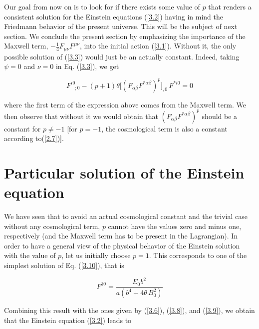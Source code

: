 \documentclass[a4paper,twocolumn,prd,superscriptaddress,nofootinbib,showpacs]
{revtex4}
\begin{document}
\medskip
Our goal from now on is to look for if there exists some value of $p$
that renders a consistent solution for the Einstein equations
(\ref{3.2}) having in mind the Friedmann behavior of the present
universe. This will be the subject of next section. We conclude the
present section by emphasizing the importance of the Maxwell term,
$-\frac{1}{4}F_{\mu\nu}F^{\mu\nu}$, into the initial action
(\ref{3.1}). Without it, the only possible solution of (\ref{3.3})
would just be an actually constant. Indeed, taking $\psi=0$ and $\nu=
0$ in Eq. (\ref{3.3}), we get

\begin{equation}
F^{i0}_{\phantom{i0};0}
-(p+1)\theta\bigl[(F_{\alpha\beta}F^{\ast\alpha\beta})^p\bigr]_{,0}\,
F^{\ast i0}=0
\label{3.11}
\end{equation}

\noindent
where the first term of the expression above comes from the Maxwell
term. We then observe that without it we would obtain that
$(F_{\alpha\beta}F^{\ast\alpha\beta})^p$ should be a constant for
$p\neq-1$ [for $p=-1$, the cosmological term is also a constant
according to(\ref{2.7})].

\section{Particular solution of the Einstein equation}
\renewcommand{\theequation}{4.\arabic{equation}}
\setcounter{equation}{0}

\medskip
We have seen that to avoid an actual cosmological constant and the
trivial case without any cosmological term, $p$ cannot have the values
zero and minus one, respectively (and the Maxwell term has to be
present in the Lagrangian). In order to have a general view of the
physical behavior of the Einstein solution with the value of $p$, let
us initially choose $p=1$. This corresponds to one of the simplest
solution of Eq. (\ref{3.10}), that is

\begin{equation}
F^{10}=\frac{E_0b^2}{a(b^4+4\theta\,B_0^2)}
\label{4.1}
\end{equation}

\noindent
Combining this result with the ones given by (\ref{3.6}), (\ref{3.8}),
and (\ref{3.9}), we obtain that the Einstein equation (\ref{3.2})
leads to
\end{document}
